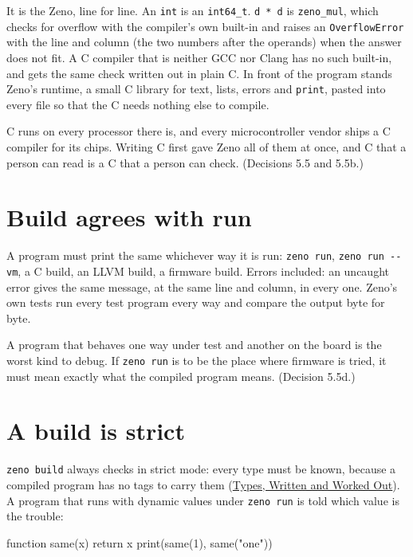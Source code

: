 It is the Zeno, line for line. An \verb|int| is an \verb|int64_t|.
\verb|d * d| is \verb|zeno_mul|, which checks for overflow with the
compiler's own built-in and raises an \verb|OverflowError| with the
line and column (the two numbers after the operands) when the answer
does not fit. A C compiler that is neither GCC nor Clang has no such
built-in, and gets the same check written out in plain C. In front of the program stands Zeno's runtime, a small
C library for text, lists, errors and \verb|print|, pasted into every
file so that the C needs nothing else to compile.

\begin{why}
C runs on every processor there is, and every microcontroller vendor
ships a C compiler for its chips. Writing C first gave Zeno all of them
at once, and C that a person can read is a C that a person can check.
(Decisions 5.5 and 5.5b.)
\end{why}

\section{Build agrees with run}

A program must print the same whichever way it is run: \verb|zeno run|,
\verb|zeno run --vm|, a C build, an LLVM build, a firmware build.
Errors included: an uncaught error gives the same message, at the same
line and column, in every one. Zeno's own tests run every test program
every way and compare the output byte for byte.

\begin{why}
A program that behaves one way under test and another on the board is
the worst kind to debug. If \verb|zeno run| is to be the place where
firmware is tried, it must mean exactly what the compiled program
means. (Decision 5.5d.)
\end{why}

\section{A build is strict}

\verb|zeno build| always checks in strict mode: every type must be
known, because a compiled program has no tags to carry them
(\hyperref[ch-types]{Types, Written and Worked Out}). A program that
runs with dynamic values under \verb|zeno run| is told which value is
the trouble:

\begin{zeno}[file=loose.zeno, cmd=zeno build {file}, fails=yes]
function same(x) {
    return x
}
print(same(1), same("one"))
\end{zeno}

